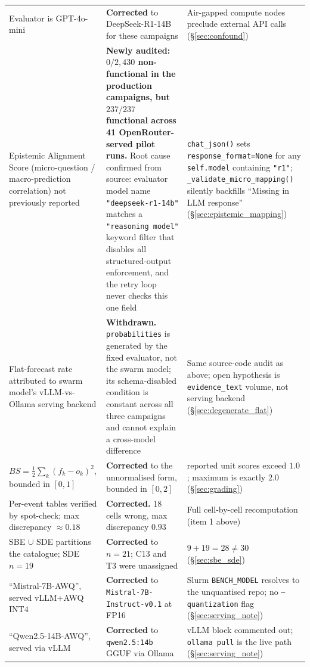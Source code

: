 \documentclass[11pt,journal,onecolumn]{IEEEtran}
\begin{document}
\begin{table}[!htbp]
\begin{tabular}{>{\raggedright\arraybackslash}p{4.4cm}>{\raggedright\arraybackslash}p{5.6cm}>{\raggedright\arraybackslash}p{5.6cm}}
\addlinespace
Evaluator is GPT-4o-mini &
\textbf{Corrected} to DeepSeek-R1-14B for these campaigns &
Air-gapped compute nodes preclude external API calls (\S\ref{sec:confound}) \\
\addlinespace
Epistemic Alignment Score (micro-question / macro-prediction correlation) not previously reported &
\textbf{Newly audited: $0/2{,}430$ non-functional in the production campaigns, but $237/237$ functional across 41 OpenRouter-served pilot runs.} Root cause confirmed from source: evaluator model name \texttt{"deepseek-r1-14b"} matches a \texttt{"reasoning model"} keyword filter that disables all structured-output enforcement, and the retry loop never checks this one field &
\texttt{chat\_json()} sets \texttt{response\_format=None} for any \texttt{self.model} containing \texttt{"r1"}; \texttt{\_validate\_micro\_mapping()} silently backfills ``Missing in LLM response'' (\S\ref{sec:epistemic_mapping}) \\
\addlinespace
Flat-forecast rate attributed to swarm model's vLLM-vs-Ollama serving backend &
\textbf{Withdrawn.} \texttt{probabilities} is generated by the fixed evaluator, not the swarm model; its schema-disabled condition is constant across all three campaigns and cannot explain a cross-model difference &
Same source-code audit as above; open hypothesis is \texttt{evidence\_text} volume, not serving backend (\S\ref{sec:degenerate_flat}) \\
\addlinespace
$BS = \frac{1}{2}\sum_k (f_k - o_k)^2$, bounded in $[0,1]$ &
\textbf{Corrected} to the unnormalised form, bounded in $[0,2]$ &
21 reported unit scores exceed $1.0$; maximum is exactly $2.0$ (\S\ref{sec:grading}) \\
\addlinespace
Per-event tables verified by spot-check; max discrepancy $\approx 0.18$ &
\textbf{Corrected.} 18 cells wrong, max discrepancy $0.93$ &
Full cell-by-cell recomputation (item 1 above) \\
\addlinespace
SBE $\cup$ SDE partitions the catalogue; SDE $n=19$ &
\textbf{Corrected} to $n=21$; C13 and T3 were unassigned &
$9 + 19 = 28 \neq 30$ (\S\ref{sec:sbe_sde}) \\
\addlinespace
``Mistral-7B-AWQ'', served vLLM+AWQ INT4 &
\textbf{Corrected} to \texttt{Mistral-7B-Instruct-v0.1} at FP16 &
Slurm \texttt{BENCH\_MODEL} resolves to the unquantised repo; no \texttt{--quantization} flag (\S\ref{sec:serving_note}) \\
\addlinespace
``Qwen2.5-14B-AWQ'', served via vLLM &
\textbf{Corrected} to \texttt{qwen2.5:14b} GGUF via Ollama &
vLLM block commented out; \texttt{ollama pull} is the live path (\S\ref{sec:serving_note}) \\

\end{tabular}
\end{table}
\end{document}
